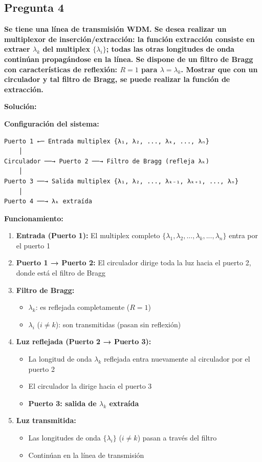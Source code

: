 \documentclass[12pt,a4paper]{article}
\begin{document}
\subsection*{Pregunta 4}
\textbf{Se tiene una línea de transmisión WDM. Se desea realizar un multiplexor de inserción/extracción: la función extracción consiste en extraer $\lambda_k$ del multiplex $\{\lambda_i\}$; todas las otras longitudes de onda continúan propagándose en la línea. Se dispone de un filtro de Bragg con características de reflexión: $R=1$ para $\lambda = \lambda_k$. Mostrar que con un circulador y tal filtro de Bragg, se puede realizar la función de extracción.}

\vspace{0.3cm}
\textbf{Solución:}

\textbf{Configuración del sistema:}

\begin{verbatim}
Puerto 1 ←─ Entrada multiplex {λ₁, λ₂, ..., λₖ, ..., λₙ}
    │
Circulador ──→ Puerto 2 ──→ Filtro de Bragg (refleja λₖ)
    │
Puerto 3 ──→ Salida multiplex {λ₁, λ₂, ..., λₖ₋₁, λₖ₊₁, ..., λₙ}
    │
Puerto 4 ──→ λₖ extraída
\end{verbatim}

\textbf{Funcionamiento:}

\begin{enumerate}
    \item \textbf{Entrada (Puerto 1):} El multiplex completo $\{\lambda_1, \lambda_2, ..., \lambda_k, ..., \lambda_n\}$ entra por el puerto 1
    
    \item \textbf{Puerto 1 → Puerto 2:} El circulador dirige toda la luz hacia el puerto 2, donde está el filtro de Bragg
    
    \item \textbf{Filtro de Bragg:}
    \begin{itemize}
        \item $\lambda_k$: es reflejada completamente ($R=1$)
        \item $\lambda_i$ ($i \neq k$): son transmitidas (pasan sin reflexión)
    \end{itemize}
    
    \item \textbf{Luz reflejada (Puerto 2 → Puerto 3):}
    \begin{itemize}
        \item La longitud de onda $\lambda_k$ reflejada entra nuevamente al circulador por el puerto 2
        \item El circulador la dirige hacia el puerto 3
        \item \textbf{Puerto 3: salida de $\lambda_k$ extraída}
    \end{itemize}
    
    \item \textbf{Luz transmitida:}
    \begin{itemize}
        \item Las longitudes de onda $\{\lambda_i\}$ ($i \neq k$) pasan a través del filtro
        \item Continúan en la línea de transmisión
    \end{itemize}
\end{enumerate}
\end{document}
